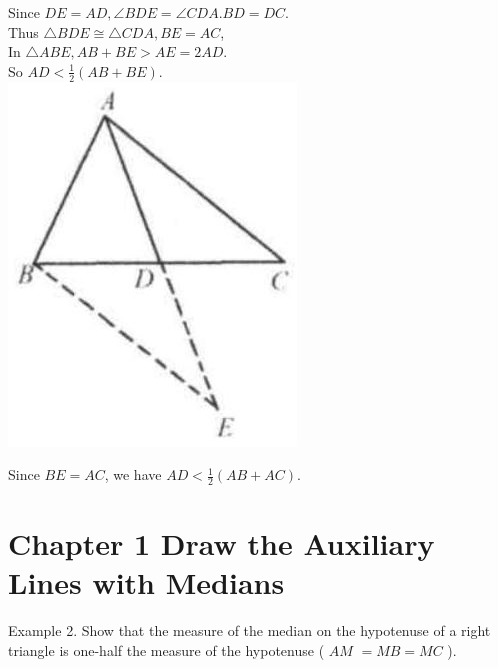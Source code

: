\documentclass[10pt]{article}
\begin{document}
Since \(D E=A D, \angle B D E=\angle C D A . B D=D C\).\\
Thus \(\triangle B D E \cong \triangle C D A, B E=A C\),\\
In \(\triangle A B E, A B+B E>A E=2 A D\).\\
So \(A D<\frac{1}{2}(A B+B E)\).\\
\includegraphics[max width=\textwidth, center]{2025_04_17_97bc1f7e44d93c271a88g-023(2)}

Since \(B E=A C\), we have \(A D<\frac{1}{2}(A B+A C)\).

\section*{Chapter 1 Draw the Auxiliary Lines with Medians}
Example 2. Show that the measure of the median on the hypotenuse of a right triangle is one-half the measure of the hypotenuse ( \(A M\) \(=M B=M C\) ).
\end{document}
